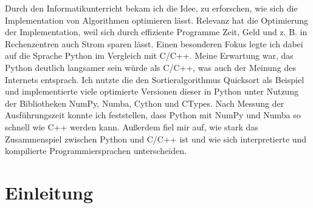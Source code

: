 \documentclass[11pt,a4paper]{article}
\begin{document}
Durch den Informatikunterricht bekam ich die Idee, zu erforschen, wie sich
die Implementation von Algorithmen optimieren lässt.
Relevanz hat die Optimierung der Implementation, weil sich durch effiziente Programme Zeit, Geld
und z. B. in Rechenzentren auch Strom sparen lässt.
Einen besonderen Fokus legte ich dabei auf die Sprache Python im Vergleich mit C/C++.
Meine Erwartung war, das Python deutlich langsamer sein würde als C/C++,
was auch der Meinung des Internets entsprach.
Ich nutzte die den Sortieralgorithmus Quicksort als Beispiel und implementierte viele optimierte Versionen dieser
in Python unter Nutzung der Bibliotheken NumPy, Numba, Cython und CTypes.
Nach Messung der Ausführungszeit konnte ich feststellen, dass Python mit NumPy und Numba
so schnell wie C++ werden kann.
Außerdem fiel mir auf, wie stark das Zusammenspiel zwischen Python und C/C++ ist
und wie sich interpretierte und kompilierte Programmiersprachen unterscheiden.

\clearpage

\renewcommand*\contentsname{Inhaltsverzeichnis}

\tableofcontents

\clearpage

\section{Einleitung}
\end{document}
